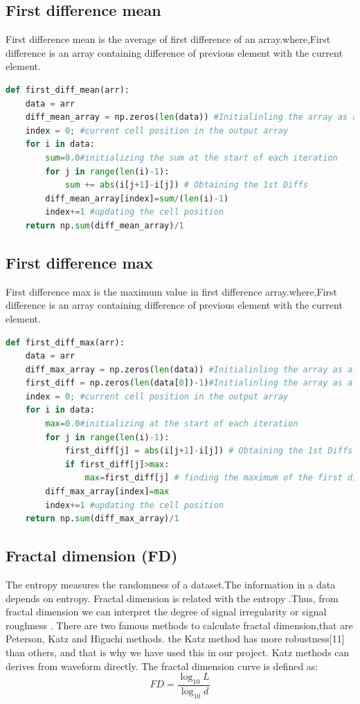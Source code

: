 \subsection{First difference mean}
First difference mean is the average of  first difference of an array.where,First difference is an array containing difference of previous element with the current element.
\begin{lstlisting}[language=Python]
def first_diff_mean(arr):
    data = arr 
    diff_mean_array = np.zeros(len(data)) #Initialinling the array as all 0s
    index = 0; #current cell position in the output array
    for i in data:
        sum=0.0#initializing the sum at the start of each iteration
        for j in range(len(i)-1):
            sum += abs(i[j+1]-i[j]) # Obtaining the 1st Diffs
        diff_mean_array[index]=sum/(len(i)-1)
        index+=1 #updating the cell position
    return np.sum(diff_mean_array)/1
\end{lstlisting}

\subsection{First difference max}
First difference max is the maximum value in first difference array.where,First difference is an array containing difference of previous element with the current element.
\begin{lstlisting}[language=Python]
def first_diff_max(arr):
    data = arr 
    diff_max_array = np.zeros(len(data)) #Initialinling the array as all 0s
    first_diff = np.zeros(len(data[0])-1)#Initialinling the array as all 0s 
    index = 0; #current cell position in the output array
    for i in data:
        max=0.0#initializing at the start of each iteration
        for j in range(len(i)-1):
            first_diff[j] = abs(i[j+1]-i[j]) # Obtaining the 1st Diffs
            if first_diff[j]>max: 
                max=first_diff[j] # finding the maximum of the first differences
        diff_max_array[index]=max
        index+=1 #updating the cell position
    return np.sum(diff_max_array)/1
\end{lstlisting}

\subsection{Fractal dimension (FD)}
The entropy measures the randomness of a dataset.The information in a data depends on entropy. Fractal dimension is related with the entropy \cite{Boostani_2004}.Thus, from fractal dimension we can interpret the degree of  signal irregularity or signal roughness . There are two famous methods to calculate fractal dimension,that are Peterson, Katz and Higuchi methods. the Katz method has  more  robustness[11] than others, and that is why we have used this in our project. Katz methods can derives from waveform directly. The  fractal dimension curve is defined as:
$$
FD = \frac{\log_{10} L}{\log_{10} d}
$$

